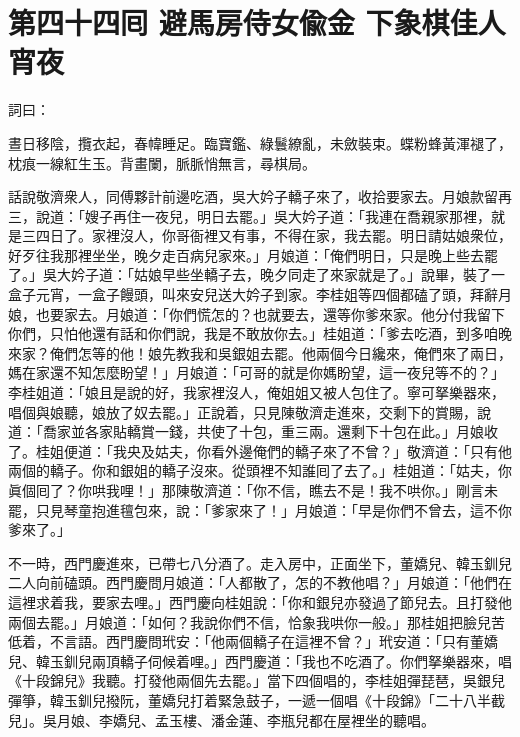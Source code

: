 
\chapter*{第四十四囘 避馬房侍女偸金 下象棋佳人宵夜}


詞曰：

\begin{myquote}
晝日移陰，攬衣起，春幃睡足。臨寶鑑、綠鬟繚亂，未斂裝束。蝶粉蜂黃渾褪了，枕痕一線紅生玉。背畫闌，脈脈悄無言，尋棋局。

\end{myquote}

話說敬濟衆人，同傅夥計前邊吃酒，吳大妗子轎子來了，收拾要家去。月娘款留再三，說道：「嫂子再住一夜兒，明日去罷。」吳大妗子道：「我連在喬親家那裡，就是三四日了。家裡沒人，你哥衙裡又有事，不得在家，我去罷。明日請姑娘衆位，好歹往我那裡坐坐，晚夕走百病兒家來。」月娘道：「俺們明日，只是晚上些去罷了。」吳大妗子道：「姑娘早些坐轎子去，晚夕同走了來家就是了。」說畢，裝了一盒子元宵，一盒子饅頭，叫來安兒送大妗子到家。李桂姐等四個都磕了頭，拜辭月娘，也要家去。月娘道：「你們慌怎的？也就要去，還等你爹來家。他分付我留下你們，只怕他還有話和你們說，我是不敢放你去。」桂姐道：「爹去吃酒，到多咱晚來家？俺們怎等的他！娘先教我和吳銀姐去罷。他兩個今日纔來，俺們來了兩日，媽在家還不知怎麼盼望！」月娘道：「可哥的就是你媽盼望，這一夜兒等不的？」李桂姐道：「娘且是說的好，我家裡沒人，俺姐姐又被人包住了。寧可拏樂器來，唱個與娘聽，娘放了奴去罷。」正說着，只見陳敬濟走進來，交剩下的賞賜，說道：「喬家並各家貼轎賞一錢，共使了十包，重三兩。還剩下十包在此。」月娘收了。桂姐便道：「我央及姑夫，你看外邊俺們的轎子來了不曾？」敬濟道：「只有他兩個的轎子。你和銀姐的轎子沒來。從頭裡不知誰囘了去了。」桂姐道：「姑夫，你眞個囘了？你哄我哩！」那陳敬濟道：「你不信，瞧去不是！我不哄你。」剛言未罷，只見琴童抱進氊包來，說：「爹家來了！」月娘道：「早是你們不曾去，這不你爹來了。」

不一時，西門慶進來，已帶七八分酒了。走入房中，正面坐下，董嬌兒、韓玉釧兒二人向前磕頭。西門慶問月娘道：「人都散了，怎的不教他唱？」月娘道：「他們在這裡求着我，要家去哩。」西門慶向桂姐說：「你和銀兒亦發過了節兒去。且打發他兩個去罷。」月娘道：「如何？我說你們不信，恰象我哄你一般。」那桂姐把臉兒苦低着，不言語。{}西門慶問玳安：「他兩個轎子在這裡不曾？」玳安道：「只有董嬌兒、韓玉釧兒兩頂轎子伺候着哩。」西門慶道：「我也不吃酒了。你們拏樂器來，唱《十段錦兒》我聽。打發他兩個先去罷。」當下四個唱的，李桂姐彈琵琶，吳銀兒彈箏，韓玉釧兒撥阮，董嬌兒打着緊急鼓子，一遞一個唱《十段錦》「二十八半截兒」。吳月娘、李嬌兒、孟玉樓、潘金蓮、李瓶兒都在屋裡坐的聽唱。

